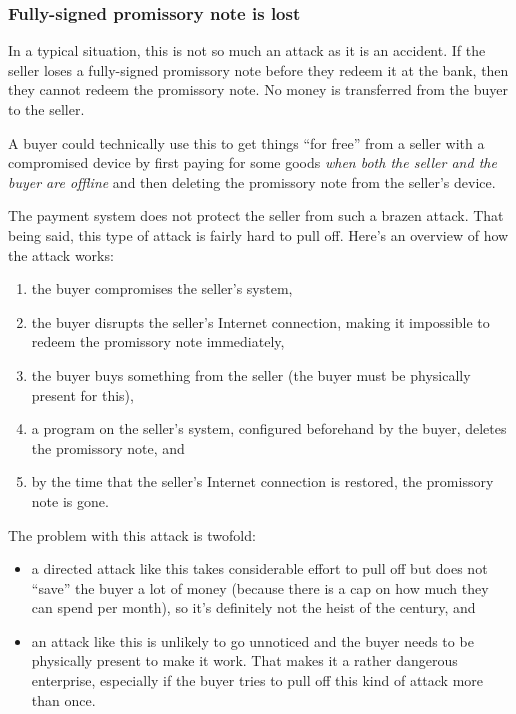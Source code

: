 \documentclass[12pt,a4paper]{article}
\begin{document}
\begin{multicols}{2}
	\subsubsection{Fully-signed promissory note is lost}
	\label{sec:signed-promissory-note-is-lost}

	In a typical situation, this is not so much an attack as it is an accident. If the seller loses a fully-signed promissory note before they redeem it at the bank, then they cannot redeem the promissory note. No money is transferred from the buyer to the seller.

	A buyer could technically use this to get things ``for free'' from a seller with a compromised device by first paying for some goods \emph{when both the seller and the buyer are offline} and then deleting the promissory note from the seller's device.

	The payment system does not protect the seller from such a brazen attack. That being said, this type of attack is fairly hard to pull off. Here's an overview of how the attack works:

	\begin{enumerate}
		\item the buyer compromises the seller's system,
		\item the buyer disrupts the seller's Internet connection, making it impossible to redeem the promissory note immediately,
		\item the buyer buys something from the seller (the buyer must be physically present for this),
		\item a program on the seller's system, configured beforehand by the buyer, deletes the promissory note, and
		\item by the time that the seller's Internet connection is restored, the promissory note is gone.
	\end{enumerate}

	The problem with this attack is twofold:

	\begin{itemize}
		\item a directed attack like this takes considerable effort to pull off but does not ``save'' the buyer a lot of money (because there is a cap on how much they can spend per month), so it's definitely not the heist of the century, and
		\item an attack like this is unlikely to go unnoticed and the buyer needs to be physically present to make it work. That makes it a rather dangerous enterprise, especially if the buyer tries to pull off this kind of attack more than once.
	\end{itemize}


\end{multicols}
\end{document}
